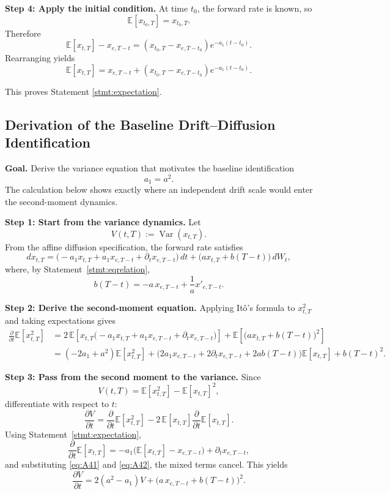 \documentclass[12pt]{article}
\theoremstyle{statementstyle}
\begin{document}
\begin{appendices}
\medskip
\noindent\textbf{Step 4: Apply the initial condition.}
At time \(t_0\), the forward rate is known, so
\[
\mathbb{E}[x_{t_0,T}] = x_{t_0,T}.
\]
Therefore
\[
\mathbb{E}[x_{t,T}] - x_{e,T-t}
=
\left(x_{t_0,T} - x_{e,T-t_0}\right)e^{-a_1(t-t_0)}.
\]
Rearranging yields
\begin{equation}
\mathbb{E}[x_{t,T}]
=
x_{e,T-t}
+
\left(x_{t_0,T}-x_{e,T-t_0}\right)e^{-a_1(t-t_0)}.
\tag{A.3.1}\label{eq:A31}
\end{equation}

This proves Statement \ref{stmt:expectation}.
\subsection{Derivation of the Baseline Drift--Diffusion Identification}
\label{appendix:A4}

\textbf{Goal.}
Derive the variance equation that motivates the baseline identification
\[
a_1=a^2.
\]
The calculation below shows exactly where an independent drift scale would enter
the second-moment dynamics.

\medskip
\noindent\textbf{Step 1: Start from the variance dynamics.}
Let
\[
V(t,T):=\operatorname{Var}(x_{t,T}).
\]
From the affine diffusion specification, the forward rate satisfies
\[
dx_{t,T}
=
\bigl(-a_1x_{t,T}+a_1x_{e,T-t}+\partial_t x_{e,T-t}\bigr)\,dt
+
\bigl(a x_{t,T}+b(T-t)\bigr)\,dW_t,
\]
where, by Statement~\ref{stmt:eqrelation},
\[
b(T-t)=-a\,x_{e,T-t}+\frac{1}{a}x'_{e,T-t}.
\]

\medskip
\noindent\textbf{Step 2: Derive the second-moment equation.}
Applying It\^o's formula to \(x_{t,T}^2\) and taking expectations gives
\begin{align}
\frac{\partial}{\partial t}\mathbb{E}[x_{t,T}^2]
&=
2\,\mathbb{E}\!\left[x_{t,T}
\bigl(-a_1x_{t,T}+a_1x_{e,T-t}+\partial_t x_{e,T-t}\bigr)\right]
+
\mathbb{E}\!\left[\bigl(a x_{t,T}+b(T-t)\bigr)^2\right]
\nonumber\\
&=
(-2a_1+a^2)\mathbb{E}[x_{t,T}^2]
+
\bigl(2a_1x_{e,T-t}+2\partial_t x_{e,T-t}+2ab(T-t)\bigr)\mathbb{E}[x_{t,T}]
+
b(T-t)^2.
\tag{A.4.1}\label{eq:A41}
\end{align}

\medskip
\noindent\textbf{Step 3: Pass from the second moment to the variance.}
Since
\[
V(t,T)=\mathbb{E}[x_{t,T}^2]-\mathbb{E}[x_{t,T}]^2,
\]
differentiate with respect to \(t\):
\[
\frac{\partial V}{\partial t}
=
\frac{\partial}{\partial t}\mathbb{E}[x_{t,T}^2]
-
2\,\mathbb{E}[x_{t,T}]
\frac{\partial}{\partial t}\mathbb{E}[x_{t,T}].
\]
Using Statement~\ref{stmt:expectation},
\[
\frac{\partial}{\partial t}\mathbb{E}[x_{t,T}]
=
-a_1\bigl(\mathbb{E}[x_{t,T}]-x_{e,T-t}\bigr)
+
\partial_t x_{e,T-t},
\tag{A.4.2}\label{eq:A42}
\]
and substituting \eqref{eq:A41} and \eqref{eq:A42}, the mixed terms cancel. This yields
\[
\frac{\partial V}{\partial t}
=
2(a^2-a_1)V
+
\bigl(a\,x_{e,T-t}+b(T-t)\bigr)^2.
\tag{A.4.3}\label{eq:A43}
\]


\end{appendices}
\end{document}
